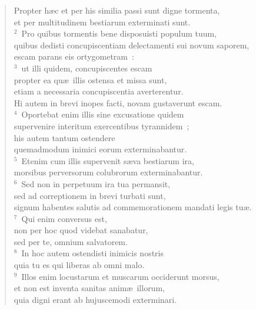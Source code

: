 \begin{flushleft}\begin{verse}\vspace{-19pt}\hspace{6pt}Propter h\ae c et per his similia passi sunt digne tormenta,\\\hspace{6pt} et per multitudinem bestiarum exterminati sunt.\\
${}^{2}$~Pro quibus tormentis bene disposuisti populum tuum,\\ quibus dedisti concupiscentiam delectamenti sui novum saporem,\\ escam parans eis ortygometram~:\\
${}^{3}$~ut illi quidem, concupiscentes escam\\ propter ea qu\ae\ illis ostensa et missa sunt,\\ etiam a necessaria concupiscentia averterentur.\\ Hi autem in brevi inopes facti, novam gustaverunt escam.\\
${}^{4}$~Oportebat enim illis sine excusatione quidem\\ supervenire interitum exercentibus tyrannidem~;\\ his autem tantum ostendere\\ quemadmodum inimici eorum exterminabantur.\\
${}^{5}$~Etenim cum illis supervenit s\ae va bestiarum ira,\\ morsibus perversorum colubrorum exterminabantur.\\
${}^{6}$~Sed non in perpetuum ira tua permansit,\\ sed ad correptionem in brevi turbati sunt,\\ signum habentes salutis ad commemorationem mandati legis tu\ae .\\
${}^{7}$~Qui enim conversus est,\\ non per hoc quod videbat sanabatur,\\ sed per te, omnium salvatorem.\\
${}^{8}$~In hoc autem ostendisti inimicis nostris\\ quia tu es qui liberas ab omni malo.\\
${}^{9}$~Illos enim locustarum et muscarum occiderunt morsus,\\ et non est inventa sanitas anim\ae\ illorum,\\ quia digni erant ab hujuscemodi exterminari.\\

\end{verse}
\end{flushleft}
